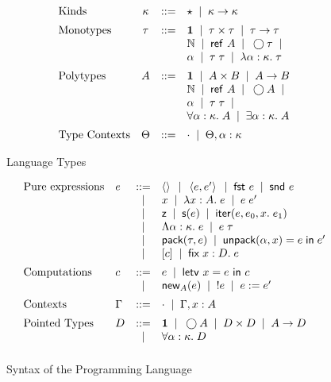 \documentclass[natbib]{sigplanconf}
\begin{document}
\begin{figure}
{\small
\begin{displaymath}
  \begin{array}{lcll}
    \mbox{Kinds} & 
      \kappa & ::= & \star \;\;|\;\; \kappa \to \kappa 
    \\[0.5em]
     \mbox{Monotypes} & 
      \tau & ::= & 
         \mathbf{1} \;\;|\;\; 
         \tau \times \tau \;\;|\;\; 
         \tau \to \tau \\
     &&& \mathbb{N} \;\;|\;\; 
         \mbox{\textsf{{ref }}}A \;\;|\;\;
         \bigcirc{\tau} \;\;|\;\; \\
     &&& \alpha \;\;|\;\;
         \tau\;\tau \;\;|\;\; 
         \lambda \alpha:\kappa.\;\tau 
    \\[0.5em]
    \mbox{Polytypes} & 
      A & ::= & 
         \mathbf{1} \;\;|\;\; 
         A \times B \;\;|\;\; 
         A \to B \\
    &&&  \mathbb{N} \;\;|\;\; 
         \mbox{\textsf{{ref }}}A \;\;|\;\;
         \bigcirc{A} \;\;|\;\; \\
    &&&  \alpha \;\;|\;\;
         \tau\;\tau \;\;|\;\; \\
    &&&  \forall \alpha:\kappa.\; A \;\;|\;\; 
         \exists \alpha:\kappa.\; A \\[0.5em]
    \mbox{Type Contexts} & 
      \Theta & ::= & \cdot \;\;|\;\; \Theta, \alpha:\kappa \\
  \end{array}
\end{displaymath}
}
\caption{Language Types}
\label{type-syntax}
\end{figure}


\begin{figure}
{\small
\begin{displaymath}
  \begin{array}{llcl}
    \mbox{Pure expressions} & 
     e & ::= & 
         \left<\right> \;\;|\;\;
         \left<{e},{e'}\right> \;\;|\;\;
         \mbox{\textsf{{fst }}} e \;\;|\;\;
         \mbox{\textsf{{snd }}} e 
\\
     &&|& x \;\;|\;\; \lambda x:A.\;e \;\;|\;\; e\;e' 
\\ 
     &&|& \mbox{\textsf{{z}}} \;\;|\;\; 
          \mbox{\textsf{{s}}}(e) \;\;|\;\; 
          \mbox{\textsf{{iter}}}(e, {e_0}, {x}.\; {e_1})
\\ 
     &&|& \Lambda \alpha:\kappa.\;e \;\;|\;\; e\;\tau 
\\ 
     &&|& \mbox{\textsf{{pack}}}({\tau}, {e}) \;\;|\;\; \mbox{\textsf{{unpack}}}({\alpha}, {x}) = {e} \;\mbox{\textsf{{in}}}\;{e'} 
\\
     &&|& [c] \;\;|\;\; \mbox{\textsf{{fix}}}\;{x:D}.\;{e}
\\[0.5em]
  \mbox{Computations} & 
    c & ::= & e \;\;|\;\; \mbox{\textsf{{letv }}}x = e\mbox{\textsf{{ in }}}c \\
   &  &  |  & \mbox{\textsf{{new}}}_{A}(e) \;\;|\;\; !e \;\;|\;\; e := e'
\\[0.5em]
  \mbox{Contexts} & 
    \Gamma & ::= & \cdot \;\;|\;\; \Gamma, x:A 
\\[0.5em]
  \mbox{Pointed Types} & 
     D & ::= & \mathbf{1} \;\;|\;\; \bigcirc{A} \;\;|\;\; D \times D \;\;|\;\; A \to D  \\
    &  &  |  & \forall \alpha:\kappa.\; D 
\\[0.5em] 
  \end{array}
\end{displaymath}
}
\caption{Syntax of the Programming Language}
\label{lang-syntax}
\end{figure}
\end{document}
